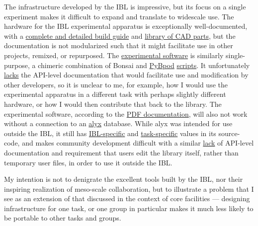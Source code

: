 \documentclass[10pt]{article}
\begin{document}
\begin{multicols}{2}
The infrastructure developed by the IBL is impressive, but its focus on
a single experiment makes it difficult to expand and translate to
widescale use. The hardware for the IBL experimental apparatus is
exceptionally well-documented, with a
\href{https://figshare.com/articles/preprint/A_standardized_and_reproducible_method_to_measure_decision-making_in_mice_Appendix_3_IBL_protocol_for_setting_up_the_behavioral_training_rig/11634732}{complete
and detailed build guide} and
\href{https://figshare.com/articles/online_resource/A_standardized_and_reproducible_method_to_measure_decision-making_in_mice_CAD_files_for_behavior_rig/11639973}{library
of CAD parts}, but the documentation is not modularized such that it
might facilitate use in other projects, remixed, or repurposed. The
\href{https://github.com/int-brain-lab/iblrig}{experimental software} is
similarly single-purpose, a chimeric combination of Bonsai \cite{lopesBonsaiEventbasedFramework2015}  and
\href{https://github.com/pybpod/pybpod}{PyBpod}
\href{https://github.com/int-brain-lab/iblrig/tree/master/tasks/_iblrig_tasks_ephysChoiceWorld}{scripts}.
It unfortunately
\href{https://iblrig.readthedocs.io/en/latest/index.html}{lacks} the
API-level documentation that would facilitate use and modification by
other developers, so it is unclear to me, for example, how I would use
the experimental apparatus in a different task with perhaps slightly
different hardware, or how I would then contribute that back to the
library. The experimental software, according to the
\href{https://figshare.com/articles/preprint/A_standardized_and_reproducible_method_to_measure_decision-making_in_mice_Appendix_3_IBL_protocol_for_setting_up_the_behavioral_training_rig/11634732}{PDF
documentation}, will also not work without a connection to an
\href{https://github.com/cortex-lab/alyx}{alyx} database. While alyx was
intended for use outside the IBL, it still has
\href{https://github.com/cortex-lab/alyx/blob/07f481f6bbde668b81ad2634f4c42df4d6a74e44/alyx/data/management/commands/files.py\#L188}{IBL-specific}
and
\href{https://github.com/cortex-lab/alyx/blob/07f481f6bbde668b81ad2634f4c42df4d6a74e44/alyx/data/fixtures/data.datasettype.json\#L29}{task-specific}
values in its source-code, and makes community development difficult
with a similar \href{https://alyx.readthedocs.io/en/latest/}{lack} of
API-level documentation and requirement that users edit the library
itself, rather than temporary user files, in order to use it outside the
IBL.

My intention is not to denigrate the excellent tools built by the IBL,
nor their inspiring realization of meso-scale collaboration, but to
illustrate a problem that I see as an extension of that discussed in the
context of core facilities --- designing infrastructure for one task, or
one group in particular makes it much less likely to be portable to
other tasks and groups.


\end{multicols}
\end{document}
